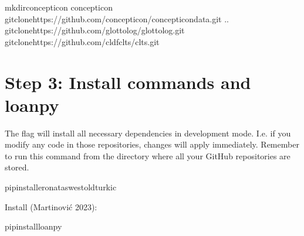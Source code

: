 \documentclass[letterpaper,10pt,english]{sphinxmanual}
\begin{document}
\begin{sphinxVerbatim}[commandchars=\\\{\}]
mkdirconcepticon
concepticon
gitclonehttps://github.com/concepticon/concepticon\PYGZhy{}data.git
..
gitclonehttps://github.com/glottolog/glottolog.git
gitclonehttps://github.com/cldf\PYGZhy{}clts/clts.git
\end{sphinxVerbatim}


\section{Step 3: Install commands and loanpy}
\label{\detokenize{mkcldf:step-3-install-commands-and-loanpy}}
\sphinxAtStartPar
The  flag will install all necessary dependencies in development mode.
I.e. if you modify any code in those repositories, changes will apply
immediately. Remember to run this command from the directory where
all your GitHub repositories are stored.

\begin{sphinxVerbatim}[commandchars=\\\{\}]
pipinstall\PYGZhy{}eronataswestoldturkic
\end{sphinxVerbatim}

\sphinxAtStartPar
Install 
(Martinović 2023):

\begin{sphinxVerbatim}[commandchars=\\\{\}]
pipinstallloanpy
\end{sphinxVerbatim}
\end{document}
